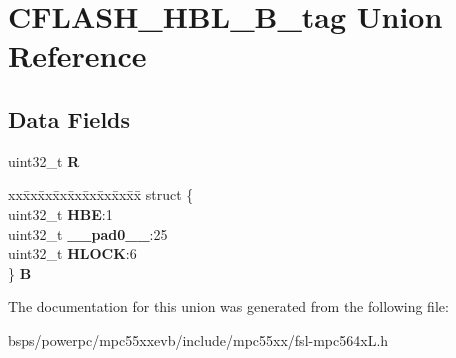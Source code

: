 \hypertarget{unionCFLASH__HBL__32B__tag}{}\section{C\+F\+L\+A\+S\+H\+\_\+\+H\+B\+L\+\_\+B\+\_\+tag Union Reference}
\label{unionCFLASH__HBL__32B__tag}
\subsection*{Data Fields}
\begin{DoxyCompactItemize}
\item 
\mbox{\label{unionCFLASH__HBL__32B__tag_abcd369fed9eb49e77488eb9ddbca935f}} 
uint32\+\_\+t {\bfseries R}
\item 
\mbox{\label{unionCFLASH__HBL__32B__tag_a536e71999d19ee008f2ce87240106ae0}} 
\begin{tabbing}
xx\=xx\=xx\=xx\=xx\=xx\=xx\=xx\=xx\=\kill
struct \{\\
\>uint32\_t {\bfseries HBE}:1\\
\>uint32\_t {\bfseries \_\_pad0\_\_}:25\\
\>uint32\_t {\bfseries HLOCK}:6\\
\} {\bfseries B}\\

\end{tabbing}\end{DoxyCompactItemize}


The documentation for this union was generated from the following file\+:\begin{DoxyCompactItemize}
\item 
bsps/powerpc/mpc55xxevb/include/mpc55xx/fsl-\/mpc564x\+L.\+h\end{DoxyCompactItemize}
